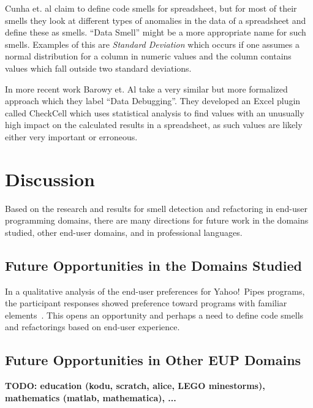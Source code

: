 \documentclass[10pt,conference,compsocconf]{IEEEtran}
\newcommand{\todo}[1]{\textbf{TODO: #1}}
\begin{document}
Cunha et. al \cite{cunha2012towards} claim to define code smells for spreadsheet, but for most of their smells they look at different types of anomalies in the data of a spreadsheet and define these as smells.
``Data Smell'' might be a more appropriate name for such smells.
Examples of this are \textit{Standard Deviation} which occurs if one assumes a normal distribution for a column in numeric values and the column contains values which fall outside two standard deviations.

In more recent work Barowy et. Al \cite{barowy2014checkcell} take a very similar but more formalized approach which they label ``Data Debugging''.
They developed an Excel plugin called CheckCell which uses statistical analysis to find values with an unusually high impact on the calculated results in a spreadsheet, as such values are likely either very important or erroneous.

\section{Discussion}
\label{sec:discussion}

Based on the research and results for smell detection and refactoring in end-user programming domains, there are many directions for future work in the domains studied, other end-user domains, and in professional languages. 






\subsection{Future Opportunities in the Domains Studied}
In a qualitative analysis of the end-user preferences for Yahoo!\ Pipes programs, the participant responses showed preference toward programs with familiar elements~\cite{Stolee2015}. This opens an opportunity and perhaps a need to define code smells and refactorings based on end-user experience. 

\subsection{Future Opportunities in Other EUP Domains}
\todo{education (kodu, scratch, alice, LEGO minestorms), mathematics (matlab, mathematica), ...}
\end{document}
